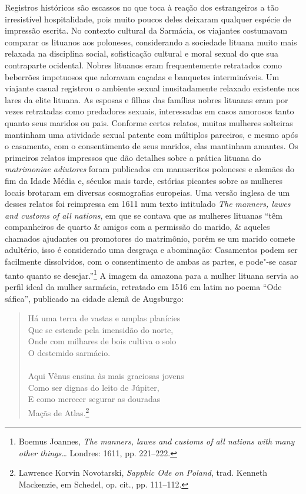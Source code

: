 Registros históricos são escassos no que toca à reação dos estrangeiros
a tão irresistível hospitalidade, pois muito poucos deles deixaram
qualquer espécie de impressão escrita. No contexto cultural da Sarmácia,
os viajantes costumavam comparar os lituanos aos poloneses, considerando
a sociedade lituana muito mais relaxada na disciplina social,
sofisticação cultural e moral sexual do que sua contraparte ocidental.
Nobres lituanos eram frequentemente retratados como beberrões impetuosos
que adoravam caçadas e banquetes intermináveis. Um viajante casual
registrou o ambiente sexual inusitadamente relaxado existente nos lares
da elite lituana. As esposas e filhas das famílias nobres lituanas eram
por vezes retratadas como predadores sexuais, interessadas em casos
amorosos tanto quanto seus maridos ou pais. Conforme certos relatos,
muitas mulheres solteiras mantinham uma atividade sexual patente com
múltiplos parceiros, e mesmo após o casamento, com o consentimento de
seus maridos, elas mantinham amantes. Os primeiros relatos impressos que
dão detalhes sobre a prática lituana do \textit{matrimoniae adiutores}
foram publicados em manuscritos poloneses e alemães do fim da Idade
Média e, séculos mais tarde, estórias picantes sobre as mulheres locais
brotaram em diversas cosmografias europeias. Uma versão inglesa de um
desses relatos foi reimpressa em 1611 num texto intitulado \textit{The
manners, lawes and customs of all nations}, em que se contava que as
mulheres lituanas ``têm companheiros de quarto \& amigos com a permissão
do marido, \& aqueles chamados ajudantes ou promotores do matrimônio,
porém se um marido comete adultério, isso é considerado uma desgraça e
abominação: Casamentos podem ser facilmente dissolvidos, com o
consentimento de ambas as partes, e pode"-se casar tanto quanto se
desejar.''\footnote{Boemus Joannes, \textit{The manners, lawes and customs of all nations with many other things\ldots{}} Londres: 1611, pp. 221--222.} A imagem da amazona para a mulher lituana servia ao perfil ideal da mulher sarmácia, retratado em 1516 em latim no poema ``Ode
sáfica'', publicado na cidade alemã de Augsburgo:

\begin{verse}
Há uma terra de vastas e amplas planícies\\
Que se estende pela imensidão do norte,\\
Onde com milhares de bois cultiva o solo\\
O destemido sarmácio.\\
\smallskip
[\ldots{}]\\
\smallskip
Aqui Vênus ensina às mais graciosas jovens\\
Como ser dignas do leito de Júpiter,\\
E como merecer segurar as douradas\\
Maçãs de Atlas.\footnote{Lawrence Korvin Novotarski, \textit{Sapphic Ode on Poland}, trad. Kenneth Mackenzie, em Schedel, op. cit., pp. 111--112.}
\end{verse}

